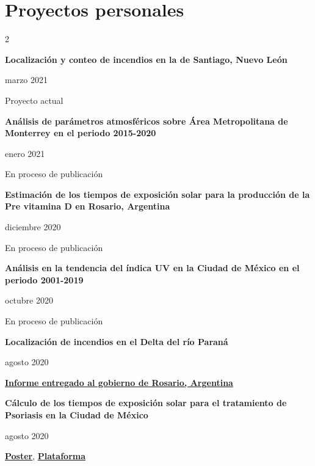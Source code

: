 \documentclass[a3paper]{adcv_color}
\newenvironment{proyects}[2]{\begin{minipage}{0.8\linewidth}\textbf{#1}
\end{minipage}\begin{minipage}{0.2\linewidth}
    \begin{flushright}
      #2
}{\end{flushright}
  \end{minipage}}
\begin{document}
\section{Proyectos personales}
\begin{multicols}{2}
  \begin{proyects}{Localización y conteo de incendios en la de Santiago, Nuevo León}{marzo 2021}
  \end{proyects}

  Proyecto actual

  \begin{proyects}{Análisis de parámetros atmosféricos sobre Área Metropolitana de Monterrey en el periodo 2015-2020}{enero 2021}
  \end{proyects}

  En proceso de publicación

  \begin{proyects}{Estimación de los tiempos de exposición solar para la producción de la Pre vitamina D en Rosario, Argentina}{diciembre 2020}
  \end{proyects}

  En proceso de publicación

  \begin{proyects}{Análisis en la tendencia del índica UV en la Ciudad de México en el periodo 2001-2019}{octubre 2020}
  \end{proyects}

  En proceso de publicación

  \begin{proyects}{Localización de incendios en el Delta del río Paraná}{agosto 2020}
  \end{proyects}

  \href{https://github.com/giovannilopez9808/Posters_templates/blob/master/Informe\%20IFIR/Focos\%20de\%20incendio\%20en\%20las\%20islas\%20del\%20Paran\%C3\%A1\%20\%20frente\%20a\%20Rosario\%20\%20(Piacentini\%2C\%20Ipi\%C3\%B1a\%2C\%20Lopez-Padilla\%2C\%20Bolmaro)\%20(Piacentini).pdf}{\textbf{Informe entregado al gobierno de Rosario, Argentina}}

  \begin{proyects}{Cálculo de los tiempos de exposición solar para el tratamiento de Psoriasis en la Ciudad de México}{agosto 2020}
  \end{proyects}

  \href{https://github.com/giovannilopez9808/Posters_templates/blob/master/2020/CNF/TES/main.pdf}{\textbf{Poster}}, \href{http://tes-v1.herokuapp.com/}{\textbf{Plataforma}}


\end{multicols}
\end{document}
